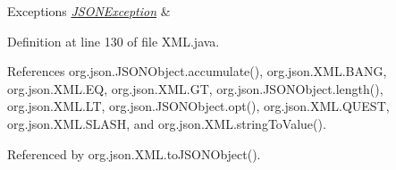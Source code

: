 \begin{DoxyExceptions}{Exceptions}
{\em \hyperlink{classorg_1_1json_1_1_j_s_o_n_exception}{J\-S\-O\-N\-Exception}} & \\
\hline
\end{DoxyExceptions}


Definition at line 130 of file X\-M\-L.\-java.



References org.\-json.\-J\-S\-O\-N\-Object.\-accumulate(), org.\-json.\-X\-M\-L.\-B\-A\-N\-G, org.\-json.\-X\-M\-L.\-E\-Q, org.\-json.\-X\-M\-L.\-G\-T, org.\-json.\-J\-S\-O\-N\-Object.\-length(), org.\-json.\-X\-M\-L.\-L\-T, org.\-json.\-J\-S\-O\-N\-Object.\-opt(), org.\-json.\-X\-M\-L.\-Q\-U\-E\-S\-T, org.\-json.\-X\-M\-L.\-S\-L\-A\-S\-H, and org.\-json.\-X\-M\-L.\-string\-To\-Value().



Referenced by org.\-json.\-X\-M\-L.\-to\-J\-S\-O\-N\-Object().


